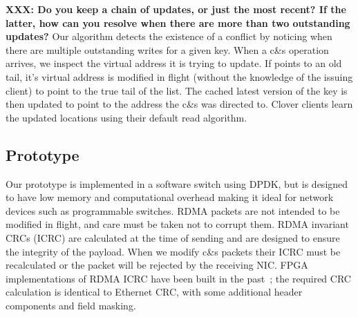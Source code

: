 \textbf{XXX: Do you keep a chain of updates, or just the most recent?
  If the latter, how can you resolve when there are more than two
  outstanding updates?}  Our algorithm detects the existence of a
conflict by noticing when there are multiple outstanding writes for a
given key. When a c\&s operation arrives, we inspect the virtual
address it is trying to update.  If points to an old tail, it's
virtual address is modified in flight (without the knowledge of the
issuing client) to point to the true tail of the list. The cached
latest version of the key is then updated to point to the address the
c\&s was directed to.  Clover clients learn the updated locations
using their default read algorithm.

\subsection{Prototype}

Our prototype is implemented in a software switch using DPDK, but is
designed to have low memory and computational overhead making it ideal
for network devices such as programmable switches.  RDMA packets are
not intended to be modified in flight, and care must be taken not to
corrupt them. RDMA invariant CRCs (ICRC) are calculated at the time of
sending and are designed to ensure the integrity of the payload. When
we modify c\&s packets their ICRC must be recalculated or the packet
will be rejected by the receiving NIC. FPGA implementations of RDMA
ICRC have been built in the past~\cite{Mansour_2019}; the required CRC
calculation is identical to Ethernet CRC, with some additional header
components and field masking.


